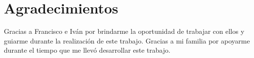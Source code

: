 

\chapter{Agradecimientos}

Gracias a Francisco e Iván por brindarme la oportunidad de trabajar con ellos y guiarme durante la realización de este trabajo. Gracias a mi familia por apoyarme durante el tiempo que me llevó desarrollar este trabajo. 
\cleardoublepage
\endinput
